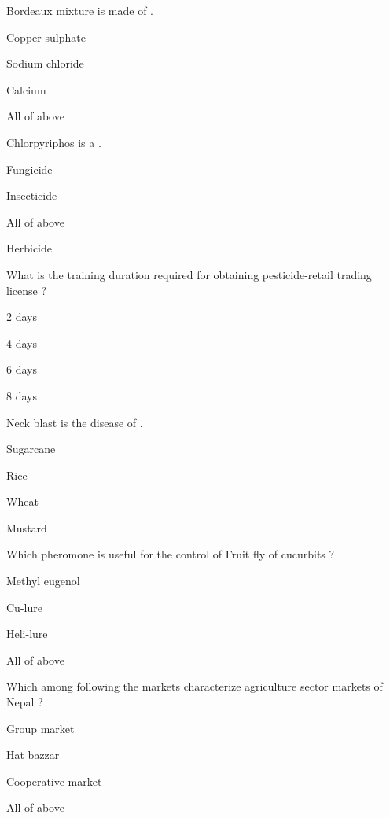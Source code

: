 \begin{questions}
\question Bordeaux mixture is made of \fillin[][3cm].
  \begin{items}
  \item* Copper sulphate
  \item Sodium chloride
  \item Calcium
  \item All of above
  \end{items}

\question Chlorpyriphos is a \fillin[][3cm].
  \begin{items}
  \item Fungicide
  \item* Insecticide
  \item All of above
  \item Herbicide
  \end{items}

\question What is the training duration required for obtaining pesticide-retail trading license ?
  \begin{items}
  \item 2 days
  \item 4 days
  \item 6 days
  \item 8 days
  \end{items}

\question Neck blast is the disease of \fillin[][3cm].
  \begin{items}
  \item Sugarcane
  \item* Rice
  \item Wheat
  \item Mustard
  \end{items}

\question Which pheromone is useful for the control of Fruit fly of cucurbits ?
  \begin{items}
  \item Methyl eugenol
  \item* Cu-lure
  \item Heli-lure
  \item All of above
  \end{items}

\question Which among following the markets characterize agriculture sector markets of Nepal ?
  \begin{items}
  \item Group market
  \item* Hat bazzar
  \item Cooperative market
  \item All of above
  \end{items}


\end{questions}
